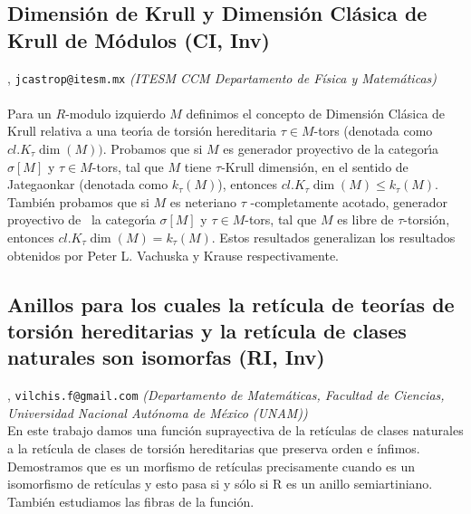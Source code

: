 \subsection{\sffamily Dimensi\'on de Krull y Dimensi\'on Cl\'asica de Krull de M\'odulos {\footnotesize (CI, Inv)}} \label{reg-345} 
, {\tt jcastrop@itesm.mx}  {\slshape (ITESM CCM Departamento de F\'isica y Matem\'aticas)}\\
\\
\noindent  Para un $R$-modulo izquierdo $M$ definimos el concepto de Dimensi\'{o}n Cl\'{a}sica de Krull relativa a una teor\'{\i}a de torsi\'{o}n hereditaria $\tau \in M$-tors (denotada como $cl.K_{\tau }\dim \left( M\right) )$. Probamos que si $M$ es generador proyectivo de la categor\'{\i}a $\sigma  \left[ M\right] $ y $\tau \in M$-tors, tal que $M$ tiene $\tau $-Krull dimensi\'{o}n, en el sentido de Jategaonkar (denotada como $k_{\tau }\left( M\right) $), entonces $cl.K_{\tau }\dim \left( M\right) \leq k_{\tau }\left( M\right)$. Tambi\'{e}n probamos que si $M$ es neteriano $\tau $ -completamente acotado, generador proyectivo de \ la categor\'{\i}a $\sigma  \left[ M\right] $ y $\tau \in M$-tors, tal que $M$ es libre de $\tau $-torsi\'{o}n, entonces $cl.K_{\tau }\dim \left( M\right) =k_{\tau }\left( M\right)  $. Estos resultados generalizan los resultados obtenidos por Peter L. Vachuska y Krause respectivamente.
\subsection{\sffamily Anillos para los  cuales la ret\'icula de teor\'ias de torsi\'on hereditarias y la ret\'icula de clases naturales son isomorfas {\footnotesize (RI, Inv)}} \label{reg-283} 
, {\tt vilchis.f@gmail.com}  {\slshape (Departamento de Matem\'aticas, Facultad de Ciencias, Universidad Nacional Aut\'onoma de M\'exico (UNAM))}\\
          \noindent En este trabajo damos una funci\'on suprayectiva de la ret\'iculas de clases naturales a la ret\'icula de clases de torsi\'on hereditarias que preserva orden e \'infimos. Demostramos que es un morfismo de ret\'iculas precisamente cuando es un isomorfismo de ret\'iculas y esto pasa si y s\'olo si R es un anillo semiartiniano. Tambi\'en estudiamos las fibras de la funci\'on.
